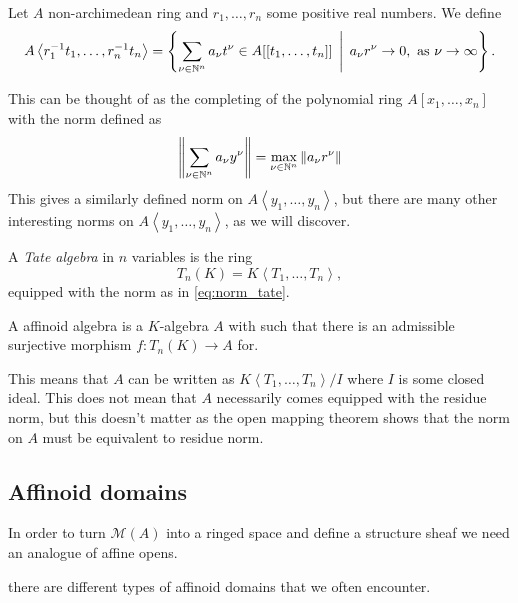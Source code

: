 \begin{definition}
	Let $A$ non-archimedean ring and $r_1, \ldots, r_n$ some positive real numbers. We define \[
		A \left<r_1^{-1}t_1, \ldots, r_{n}^{-1} t_n \right> = \left\{\sum_{\nu \in \N^{n}}^{} a_\nu t^{\nu} \in A[[t_1,\ldots, t_n]]\st a_\nu r^{\nu} \to 0, \text{ as } \nu \to \infty\right\} 
	.\] 
\end{definition}
This can be thought of as the completing of the polynomial ring $A[x_1, \ldots, x_n]$ with the norm defined as 
\begin{equation}\label{eq:norm_tate}
	\left\| \sum_{\nu \in \mathbb{N}^{n}} a_\nu y^{\nu}\right\| = \max_{\nu \in \mathbb{N}^{n}} \|a_\nu r^{\nu}\|
\end{equation}
This gives a similarly defined norm on $A\left<y_1, \ldots, y_n \right>$, but there are many other interesting norms on $A \left<y_1, \ldots, y_n \right>$, as we will discover. 

\begin{definition}
	A \emph{Tate algebra} in $n$ variables is the ring \[
		T_n(K) = K\left<T_1, \ldots, T_n \right>
	,\]
	equipped with the norm as in \eqref{eq:norm_tate}.
\end{definition}


\begin{definition}
	A affinoid algebra is a $K$-algebra $A$ with such that there is an admissible surjective morphism $f: T_n(K) \to A$ for. 
\end{definition}
This means that $A$ can be written as $K\left<T_1, \ldots, T_n \right> / I$ where $I$ is some closed ideal.
This does not mean that $A$ necessarily comes equipped with the residue norm, but this doesn't matter as the open mapping theorem shows that the norm on $A$ must be equivalent to residue norm.

\subsection{Affinoid domains} \label{sec:affinoid_domains}

In order to turn $\mathcal{M} (A)$ into a ringed space and define a structure sheaf we need an analogue of affine opens.  

there are different types of affinoid domains that we often encounter. 

